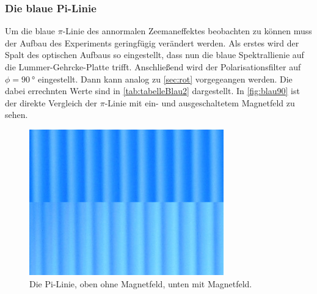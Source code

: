 \subsubsection{Die blaue Pi-Linie}
Um die blaue $\pi$-Linie des annormalen Zeemaneffektes beobachten zu können muss der 
Aufbau des Experiments geringfügig verändert werden. Als erstes wird der Spalt des optischen 
Aufbaus so eingestellt, dass nun die blaue Spektrallienie auf die Lummer-Gehrcke-Platte trifft.
Anschließend wird der Polarisationsfilter auf $\phi=\SI[]{90}[]{\degree}$ eingestellt.
Dann kann analog zu \autoref{sec:rot} vorgegeangen werden. Die dabei errechnten Werte
sind in \autoref{tab:tabelleBlau2} dargestellt. In \autoref{fig:blau90} ist der direkte Vergleich
der $\pi$-Linie mit ein- und ausgeschaltetem Magnetfeld zu sehen.
\begin{figure}
  \centering
  \includegraphics[width=0.75\textwidth]{content/grafiken/blau 90.JPG}
  \caption{Die Pi-Linie, oben ohne Magnetfeld, unten mit Magnetfeld.}
  \label{fig:blau90}
\end{figure}



\FloatBarrier
